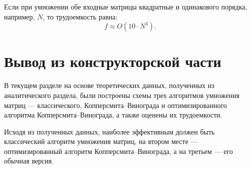 Если при умножении обе входные матрицы квадратные и одинакового порядка, например, $N$, то трудоемкость равна:
\begin{equation}
f \approx O(10 \cdot N^3).
\end{equation}

\section*{Вывод из конструкторской части}

В текущем разделе на основе теоретических данных, полученных из аналитического раздела, были построены схемы трех алгоритмов умножения матриц --- классического, Копперсмита--Винограда и оптимизированного алгоритма Копперсмита--Винограда, а также оценены их трудоемкости.

Исходя из полученных данных, наиболее эффективным должен быть классический алгоритм умножения матриц, на втором месте --- оптимизированный алгоритм Копперсмита--Винограда, а на третьем --- его обычная версия.
